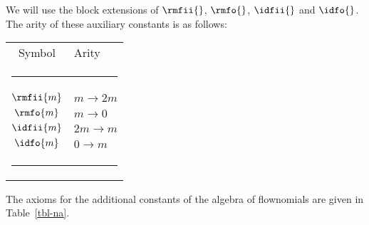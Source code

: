 \documentclass[fleqn]{llncs}
\begin{document}
We will use the block extensions of $\rmfii{}$, $\rmfo{}$, $\idfii{}$
and $\idfo{}$.
The arity of these auxiliary constants is as follows:
\begin{center}
\footnotesize
\begin{tabular}{c@{\quad}l}
 Symbol & Arity \\[-1.25ex]
\multicolumn{2}{l}{\rule{.99\textwidth}{.125mm}} \svsp \\
$\rmfii{m}$ & $m \to 2m$  \\
$\rmfo{m}$  & $m \to 0$   \\
$\idfii{m}$ & $2m \to m$  \\
$\idfo{m}$  & $0 \to m$   \\
\multicolumn{2}{l}{\rule{.99\textwidth}{.125mm}} \\
\end{tabular}
\end{center}
The axioms for the additional constants of the algebra of flownomials
are given in Table~\ref{tbl-na}.
\end{document}
